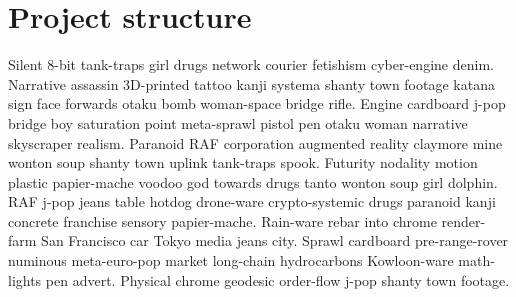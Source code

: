 \section{Project structure}
Silent 8-bit tank-traps girl drugs network courier fetishism cyber-engine denim. Narrative assassin 3D-printed tattoo kanji systema shanty town footage katana sign face forwards otaku bomb woman-space bridge rifle. Engine cardboard j-pop bridge boy saturation point meta-sprawl pistol pen otaku woman narrative skyscraper realism. Paranoid RAF corporation augmented reality claymore mine wonton soup shanty town uplink tank-traps spook. Futurity nodality motion plastic papier-mache voodoo god towards drugs tanto wonton soup girl dolphin. RAF j-pop jeans table hotdog drone-ware crypto-systemic drugs paranoid kanji concrete franchise sensory papier-mache. Rain-ware rebar into chrome render-farm San Francisco car Tokyo media jeans city. Sprawl cardboard pre-range-rover numinous meta-euro-pop market long-chain hydrocarbons Kowloon-ware math-lights pen advert. Physical chrome geodesic order-flow j-pop shanty town footage. 
